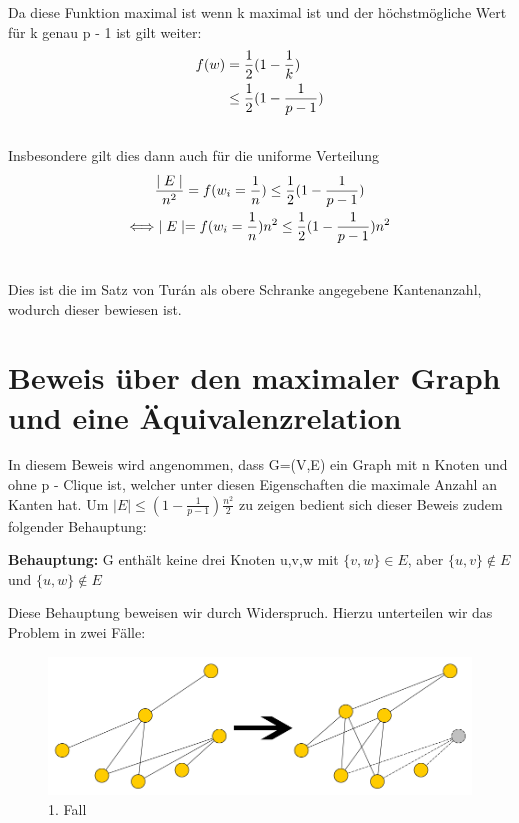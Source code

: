 \documentclass[12pt, a4paper]{article}
\begin{document}
Da diese Funktion maximal ist wenn k maximal ist und der höchstmögliche Wert für k genau p - 1 ist gilt weiter:
\begin{gather}
\begin{split}f(w) &= \frac{1}{2} (1 - \frac{1}{k}) \\
&\le \frac{1}{2} (1 - \frac{1}{p-1})\end{split}\notag\\\begin{split}\end{split}\notag
\end{gather}
Insbesondere gilt dies dann auch für die uniforme Verteilung
\begin{gather}
\begin{split}&\frac{\mid E \mid}{n^2} = f(w_i = \frac{1}{n}) \le \frac{1}{2} (1 - \frac{1}{p-1}) \\
\Longleftrightarrow &\mid E \mid = f(w_i = \frac{1}{n})  n^2 \le \frac{1}{2} (1 - \frac{1}{p-1})  n^2\end{split}\notag\\\begin{split}\end{split}\notag
\end{gather}

Dies ist die im Satz von Turán als obere Schranke angegebene Kantenanzahl, wodurch dieser bewiesen ist.

\section{Beweis über den maximaler Graph und eine Äquivalenzrelation}
\label{proof/fifth:funfter-beweis-maximaler-graph-und-aquivalenzrelation}\label{proof/fifth::doc}\label{proof/fifth:index-1}
In diesem Beweis wird angenommen, dass G=(V,E) ein Graph mit n Knoten und ohne p - Clique ist, welcher unter diesen Eigenschaften die maximale Anzahl an Kanten hat.
Um $\mid E \mid \le (1- \frac{1}{p-1}) \frac{n^2}{2}$ zu zeigen bedient sich dieser Beweis zudem folgender Behauptung:

\textbf{Behauptung:} G enthält keine drei Knoten u,v,w mit $\{ v, w \} \in E$, aber $\{ u, v \} \notin E$ und $\{ u, w \} \notin E$

Diese Behauptung beweisen wir durch Widerspruch. Hierzu unterteilen wir das Problem in zwei Fälle:

\begin{figure}[H] 
		\centering
		\includegraphics[page=1, width=\textwidth]{assets/proof5-case1}
		\caption{1. Fall} 
\end{figure}
\end{document}
